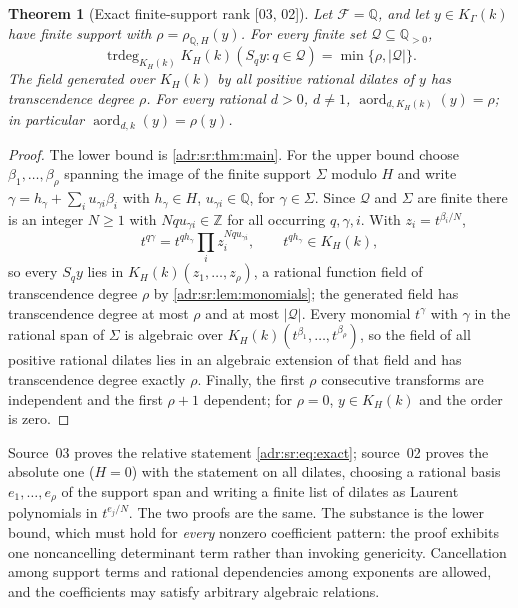 \documentclass[11pt,letterpaper]{article}
\numberwithin{equation}{section}
\newtheorem{theorem}{Theorem}[section]
\theoremstyle{definition}
\theoremstyle{remark}
\newcommand{\Q}{\mathbb Q}
\newcommand{\Z}{\mathbb Z}
\newcommand{\K}{K_\Gamma(k)}
\newcommand{\trdeg}{\operatorname{trdeg}}
\newcommand{\src}[1]{\textup{[#1]}}%
\begin{document}
\begin{theorem}[Exact finite-support rank \src{03, 02}]
\label{adr:sr:thm:finite}
Let $\mathcal F=\Q$, and let $y\in\K$ have finite support with
$\rho=\rho_{\Q,H}(y)$. For every finite set $\mathcal Q\subseteq\Q_{>0}$,
\begin{equation}\label{adr:sr:eq:exact}
 \trdeg_{K_H(k)}K_H(k)(S_qy:q\in\mathcal Q)=\min\{\rho,|\mathcal Q|\}.
\end{equation}
The field generated over $K_H(k)$ by all positive rational dilates of $y$ has
transcendence degree $\rho$. For every rational $d>0$, $d\ne1$,
$\operatorname{aord}_{d,K_H(k)}(y)=\rho$; in particular
$\operatorname{aord}_{d,k}(y)=\rho(y)$.
\end{theorem}
\begin{proof}
The lower bound is \cref{adr:sr:thm:main}. For the upper bound choose
$\beta_1,\ldots,\beta_\rho$ spanning the image of the finite support $\Sigma$
modulo $H$ and write $\gamma=h_\gamma+\sum_iu_{\gamma i}\beta_i$ with
$h_\gamma\in H$, $u_{\gamma i}\in\Q$, for $\gamma\in\Sigma$. Since $\mathcal Q$
and $\Sigma$ are finite there is an integer $N\ge1$ with
$Nqu_{\gamma i}\in\Z$ for all occurring $q,\gamma,i$. With $z_i=t^{\beta_i/N}$,
\[
 t^{q\gamma}=t^{qh_\gamma}\prod_iz_i^{Nqu_{\gamma i}},\qquad t^{qh_\gamma}\in K_H(k),
\]
so every $S_qy$ lies in $K_H(k)(z_1,\ldots,z_\rho)$, a rational function field
of transcendence degree $\rho$ by \cref{adr:sr:lem:monomials}; the generated
field has transcendence degree at most $\rho$ and at most $|\mathcal Q|$.
Every monomial $t^\gamma$ with $\gamma$ in the rational span of $\Sigma$ is
algebraic over $K_H(k)(t^{\beta_1},\ldots,t^{\beta_\rho})$, so the field of
all positive rational dilates lies in an algebraic extension of that field and
has transcendence degree exactly $\rho$. Finally, the first $\rho$ consecutive
transforms are independent and the first $\rho+1$ dependent; for $\rho=0$,
$y\in K_H(k)$ and the order is zero.
\end{proof}

Source~03 proves the relative statement \eqref{adr:sr:eq:exact}; source~02
proves the absolute one ($H=0$) with the statement on all dilates, choosing a
rational basis $e_1,\ldots,e_\rho$ of the support span and writing a finite
list of dilates as Laurent polynomials in $t^{e_j/N}$. The two proofs are the
same. The substance is the lower bound, which must hold for \emph{every}
nonzero coefficient pattern: the proof exhibits one noncancelling determinant
term rather than invoking genericity. Cancellation among support terms and
rational dependencies among exponents are allowed, and the coefficients may
satisfy arbitrary algebraic relations.
\end{document}
